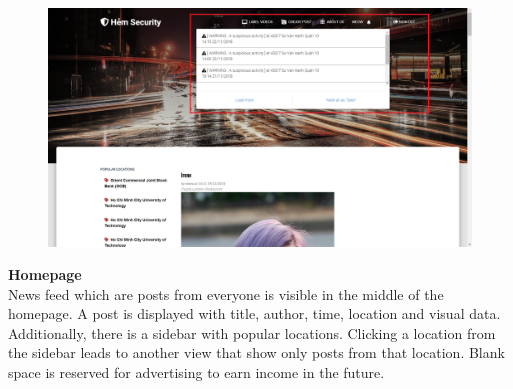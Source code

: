 \begin{figure}[!htb]
\endminipage\hfill
{}
  \includegraphics[width=\linewidth]{images/chap4/header.png}
\endminipage
\end{figure}
\cleardoublepage
\textbf{Homepage}
\\
News feed which are posts from everyone is visible in the middle of the homepage. A post is displayed with title, author, time, location and visual data. Additionally, there is a sidebar with popular locations. Clicking a location from the sidebar leads to another view that show only posts from that location. Blank space is reserved for advertising to earn income in the future.
